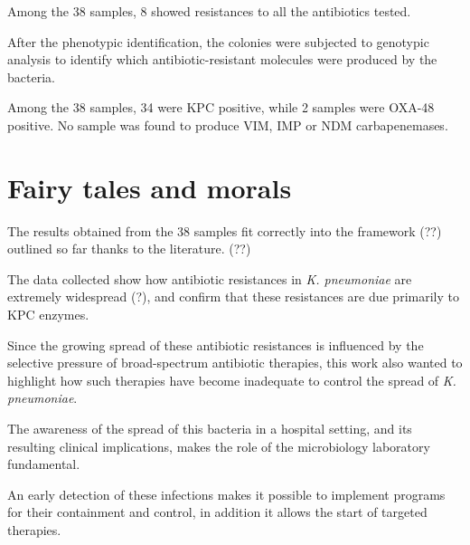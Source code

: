 \documentclass[11pt]{report}
\begin{document}
Among the 38 samples, 8 showed resistances to all the antibiotics tested.


After the phenotypic identification, the colonies were subjected to genotypic analysis to identify which antibiotic-resistant molecules were produced by the bacteria.

Among the 38 samples, 34 were KPC positive, while 2 samples were OXA-48 positive.
No sample was found to produce VIM, IMP or NDM carbapenemases.


\chapter{Fairy tales and morals}
The results obtained from the 38 samples fit correctly into the framework (??) outlined so far thanks to the literature. (??)

The data collected show how antibiotic resistances in \emph{K. pneumoniae} are extremely widespread (?), and confirm that these resistances are due primarily to KPC enzymes.

Since the growing spread of these antibiotic resistances is influenced by the selective pressure of broad-spectrum antibiotic therapies, this work also wanted to highlight how such therapies have become inadequate to control the spread of \emph{K. pneumoniae}.

The awareness of the spread of this bacteria in a hospital setting, and its resulting clinical implications, makes the role of the microbiology laboratory fundamental. 

An early detection of these infections makes it possible to implement programs for their containment and control, in addition it allows the start of targeted therapies.
































\end{document}
